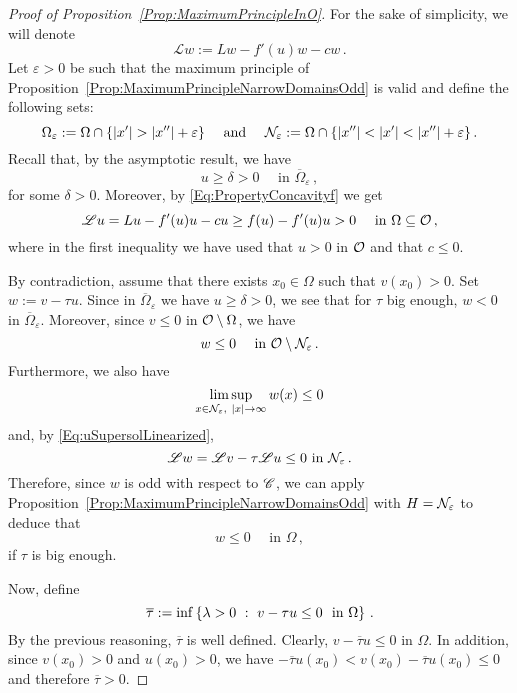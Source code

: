 \begin{proof}[Proof of Proposition~\ref{Prop:MaximumPrincipleInO}]
    


	For the sake of simplicity, we will denote 
	$$
	\mathscr{L} w := Lw - f'(u)w - cw\,.
	$$
	Let $\varepsilon > 0$ be such that the maximum principle of Proposition~\ref{Prop:MaximumPrincipleNarrowDomainsOdd} is valid and define the following sets:
	$$
	\Omega_\varepsilon := \Omega \cap \{|x'| > |x''| + \varepsilon\}\quad \textrm{ and } \quad 
	\mathcal{N}_\varepsilon := \Omega \cap \{|x''| < |x'| < |x''| + \varepsilon\}\,.
	$$
	Recall that, by the asymptotic result, we have 
	$$
	u \geq \delta > 0 \quad \textrm{ in } \overline{\Omega}_\varepsilon\,,
	$$
	for some $\delta >0$.  Moreover, by \eqref{Eq:PropertyConcavityf} we get
	\begin{equation}
	\label{Eq:uSupersolLinearized}
	\mathscr{L} u = Lu - f'(u)u - cu \geq f(u) - f'(u)u > 0 \quad \textrm{ in } \Omega \subseteq \mathcal{O}\,,
	\end{equation}
	where in the first inequality we have used that $u>0$ in $\mathcal{O}$ and that $c\leq 0$.
	
    
    By contradiction, assume that there exists $x_0\in \Omega$ such that $v(x_0)> 0$.
	Set $w := v - \tau u$. Since in $\overline{\Omega}_\varepsilon$ we have $u \geq \delta > 0$, we see that for $\tau$ big enough, $w < 0$ in $\overline{\Omega}_\varepsilon$. Moreover, since $v\leq 0$ in $\mathcal{O}\setminus\Omega$, we have 
	$$
	w \leq 0 \quad \textrm{ in } \mathcal{O} \setminus \mathcal{N}_\varepsilon\,.
	$$
	Furthermore, we also have
	$$
	\limsup_{x\in \mathcal{N}_\varepsilon, \ |x|\to \infty} w(x) \leq 0
	$$
	and, by \eqref{Eq:uSupersolLinearized},
	$$
	\mathscr{L} w = \mathscr{L} v - \tau \mathscr{L} u \leq 0 \textrm{ in } \mathcal{N}_\varepsilon\,.
	$$
	Therefore, since $w$ is odd with respect to $\mathscr{C}$, we can apply Proposition~\ref{Prop:MaximumPrincipleNarrowDomainsOdd} with $H = \mathcal{N}_\varepsilon$ to deduce that
	$$
	w \leq 0 \quad \textrm{ in } \Omega\,,
	$$
	if $\tau$ is big enough.
	
	Now, define 
	$$
	\overline{\tau}:= \inf \left \{ \lambda > 0 \ : \ v - \tau u \leq 0 \ \textrm{ in } \Omega \right \}\,.
	$$
	By the previous reasoning, $\overline{\tau}$ is well defined. Clearly, $v - \overline{\tau} u \leq 0 $ in $\Omega$. In addition, since $v(x_0)>0$ and $u(x_0)>0$, we have $-\overline{\tau} u(x_0) < v(x_0) - \overline{\tau} u (x_0) \leq 0$ and therefore $\overline{\tau} > 0$.
	

\end{proof}
